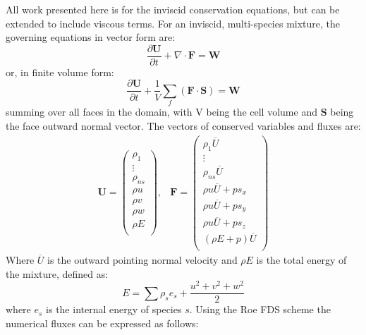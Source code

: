 \documentclass[]{aiaa-tc}%
\begin{document}
All work presented here is for the inviscid conservation equations, but can be extended to include viscous terms.  For an inviscid, multi-species mixture, the governing equations in vector form are:
%
\begin{equation}
	\label{inv_flux_vec}
	\frac{\partial \mathbf{U}}{\partial t}
	+ \nabla\cdot \mathbf{F} = \mathbf{W}
\end{equation}
%
 or, in finite volume form:
\begin{equation}
	\label{inv_flux_fv}
	\frac{\partial \mathbf{U}}{\partial t}
	 + \frac{1}{V}\sum\limits_{f}(\mathbf{F}\cdot\mathbf{S}) = \mathbf{W}
 \end{equation}
summing over all faces in the domain, with V being the cell volume and $\mathbf{S}$ being the face outward normal vector.  The vectors of conserved variables and fluxes are:
%
\begin{equation}
	\begin{matrix}
	\mathbf{U}=\begin{pmatrix}
   		\rho_1\\
		\vdots \\
		\rho_{ns} \\
		\rho u \\
		\rho v \\
		\rho w \\
		\rho E \\
	\end{pmatrix},      &
 	\mathbf{F} = \begin{pmatrix}
		\rho_1  \overline{U} \\
		\vdots \\
		\rho_{ns} \overline{U} \\
		\rho u \overline{U} + p s_x\\
		\rho u \overline{U} + p s_y\\
		\rho u \overline{U} + p s_z\\
		(\rho E + p) \overline{U} \\
	\end{pmatrix}
	\end{matrix}
 \end{equation}
 Where $\overline{U}$ is the outward pointing normal velocity and $\rho E$ is the total energy of the mixture, defined as:
 \begin{equation}
 	E = \sum{\rho_s e_s} + \frac{u^2+v^2+w^2}{2}
\end{equation}
%
where $e_s$ is the internal energy of species $s$.  Using the Roe FDS scheme the numerical fluxes can be expressed as follows:
\end{document}
